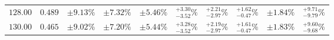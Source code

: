 \begin{table}[ht!]
{{\begin{tabular}{| cc | ccc | cccc | c |}
$128.00$ & $0.489$ & $\pm9.13\%$ & {\color{black!55}$\pm 7.32\%$} & {\color{black!55}$\pm 5.46\%$} & $^{+3.30}_{-3.52}\%$ & {\color{black!55}$^{+2.21}_{-2.97}\%$} & {\color{black!55}$^{+1.62}_{-0.47}\%$} & {\color{black!55}$\pm 1.84\%$} & $^{+9.71}_{-9.79}\%$  \\
$130.00$ & $0.465$ & $\pm9.02\%$ & {\color{black!55}$\pm 7.20\%$} & {\color{black!55}$\pm 5.44\%$} & $^{+3.28}_{-3.52}\%$ & {\color{black!55}$^{+2.19}_{-2.97}\%$} & {\color{black!55}$^{+1.61}_{-0.47}\%$} & {\color{black!55}$\pm 1.83\%$} & $^{+9.60}_{-9.68}\%$  \\
\cline{1-10}
\end{tabular}
}
}
\end{table}

